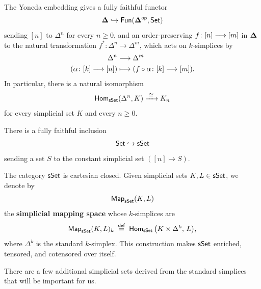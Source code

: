 \begin{observation}
    The Yoneda embedding gives a fully faithful functor
    \begin{equation}
        \mathbf\Delta \hookrightarrow \operatorname{\sf Fun}(\mathbf\Delta^{\mathsf{op}},\operatorname{{\mathsf{Set}}})
    \end{equation} 
    sending $[n]$ to $\Delta^n$ for every $n\geq 0$, and an order-preserving $f\colon [n] \longrightarrow [m]$ in $\mathbf\Delta$ to the natural transformation $f^\ast\colon \Delta^{n}\to\Delta^{m}$, which acts on $k$-simplices by 
    \begin{align*}
        \Delta^n &\longrightarrow \Delta^m \\
        (\alpha\colon [k] \longrightarrow [n]) &\longmapsto ( f\circ \alpha \colon [k] \longrightarrow [m]).
    \end{align*}
    In particular, there is a natural isomorphism 
    \begin{equation}
        \operatorname{\sf Hom}_{\operatorname{\sf sSet}}(\Delta^n, K) \xrightarrow{\,\,\cong\,\,} K_n
    \end{equation} 
    for every simplicial set $K$ and every $n\geq 0$.
\end{observation}

\begin{observation}
    There is a fully faithful inclusion 
    \begin{equation}\label{ch2:: def: set in ssets}
        \operatorname{{\mathsf{Set}}} \hookrightarrow \operatorname{\sf sSet} 
    \end{equation}
    sending a set $S$ to the constant simplicial set $([n] \mapsto S)$.
\end{observation}

\begin{definition}\label{ch2:: def: sset-mapping-space}
    The category $\operatorname{\sf sSet}$ is cartesian closed. Given simplicial sets $K,L\in\operatorname{\sf sSet}$, we denote by
    \begin{equation}
        \operatorname{{\sf Map}}_{\operatorname{\sf sSet}}(K,L)
    \end{equation}
    the \textbf{simplicial mapping space} whose $k$-simplices are
    \begin{equation}
        \operatorname{{\sf Map}}_{\operatorname{\sf sSet}}(K,L)_k \;\overset{\sf def}{=}\;
        \operatorname{\sf Hom}_{\operatorname{\sf sSet}}\big(K \times \Delta^k,\, L\big),
    \end{equation}
    where $\Delta^k$ is the standard $k$-simplex. This construction makes $\operatorname{\sf sSet}$ enriched, tensored, and cotensored over itself.
\end{definition}

There are a few additional simplicial sets derived from the standard simplices that will be important for us.

